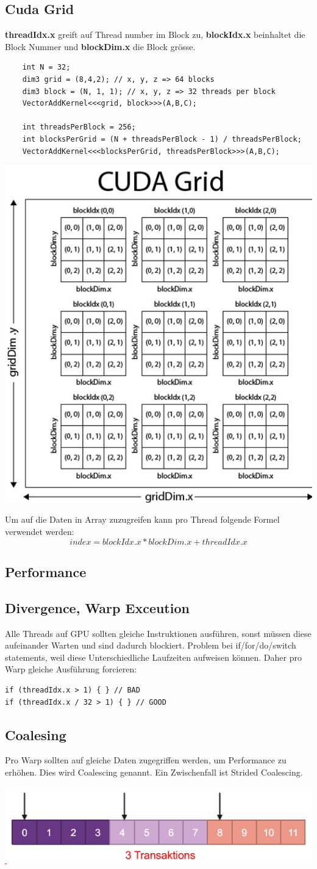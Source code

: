 \subsection{Cuda Grid}
\textbf{threadIdx.x} greift auf Thread number im Block zu, \textbf{blockIdx.x} beinhaltet die Block Nummer und \textbf{blockDim.x} die Block grösse.
\begin{center}
\begin{lstlisting}
	int N = 32;
	dim3 grid = (8,4,2); // x, y, z => 64 blocks
	dim3 block = (N, 1, 1); // x, y, z => 32 threads per block
	VectorAddKernel<<<grid, block>>>(A,B,C);
	
	int threadsPerBlock = 256;
	int blocksPerGrid = (N + threadsPerBlock - 1) / threadsPerBlock;
	VectorAddKernel<<<blocksPerGrid, threadsPerBlock>>>(A,B,C);
\end{lstlisting}
	\includegraphics[width=0.6\columnwidth]{Images/grid}
\end{center}
Um auf die Daten in Array zuzugreifen kann pro Thread folgende Formel verwendet werden:
\[
index = blockIdx.x * blockDim.x + threadIdx.x
\]

\subsection{Performance}
\subsection{Divergence, Warp Exceution}
Alle Threads auf GPU sollten gleiche Instruktionen ausführen, sonst müssen diese aufeinander Warten und sind dadurch blockiert. Problem bei if/for/do/switch statements, weil diese Unterschiedliche Laufzeiten aufweisen können. Daher pro Warp gleiche Ausführung forcieren:
\begin{lstlisting}
if (threadIdx.x > 1) { } // BAD
if (threadIdx.x / 32 > 1) { } // GOOD
\end{lstlisting}

\subsection{Coalesing}
Pro Warp sollten auf gleiche Daten zugegriffen werden, um Performance zu erhöhen. Dies wird Coalescing genannt. Ein Zwischenfall ist Strided Coalescing.
\begin{center}
	\includegraphics[width=0.8\columnwidth]{Sections/coalescing}
\end{center}
